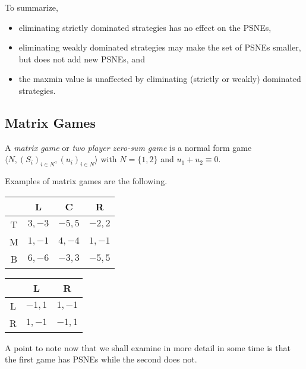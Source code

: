 	To summarize,
	\begin{itemize}
		\item eliminating strictly dominated strategies has no effect on the PSNEs,
		\item eliminating weakly dominated strategies may make the set of PSNEs smaller, but does not add new PSNEs, and
		\item the maxmin value is unaffected by eliminating (strictly or weakly) dominated strategies.
	\end{itemize}

\subsection{Matrix Games}

	\begin{fdef}
		A \emph{matrix game} or \emph{two player zero-sum game} is a normal form game $\langle N , (S_i)_{i \in N} , (u_i)_{i \in N} \rangle$ with $N = \{1,2\}$ and $u_1 + u_2 \equiv 0$.
	\end{fdef}

	\begin{fex}
		\label{ex: matrix game}
		Examples of matrix games are the following.

		\begin{center}
		\begin{tabular}{|c||c|c|c|}
			\hline
			& \textsf{L} & \textsf{C} & \textsf{R} \\ \hline \hline
			\textsf{T} & $3,-3$ & $-5,5$ & $-2,2$ \\ \hline
			\textsf{M} & $1,-1$ & $4,-4$ & $1,-1$ \\ \hline
			\textsf{B} & $6,-6$ & $-3,3$ & $-5,5$ \\ \hline
		\end{tabular}
		\end{center}

		\begin{center}
		\begin{tabular}{|c||c|c|}
			\hline
			& \textsf{L} & \textsf{R} \\ \hline\hline
			\textsf{L} & $-1,1$ & $1,-1$ \\ \hline
			\textsf{R} & $1,-1$ & $-1,1$ \\ \hline
		\end{tabular}
		\end{center}

		A point to note now that we shall examine in more detail in some time is that the first game has PSNEs while the second does not.
	\end{fex}

